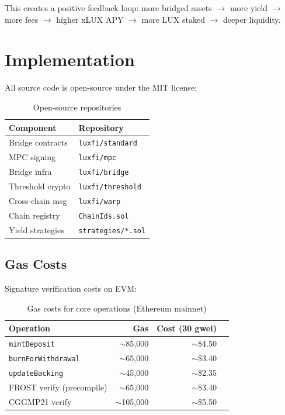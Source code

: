 \documentclass[11pt,twocolumn]{article}
\begin{document}
This creates a positive feedback loop: more bridged assets $\to$ more yield $\to$ more fees $\to$ higher xLUX APY $\to$ more LUX staked $\to$ deeper liquidity.

\section{Implementation}

All source code is open-source under the MIT license:

\begin{table}[h]
\centering
\small
\begin{tabular}{ll}
\toprule
\textbf{Component} & \textbf{Repository} \\
\midrule
Bridge contracts & \texttt{luxfi/standard} \\
MPC signing & \texttt{luxfi/mpc} \\
Bridge infra & \texttt{luxfi/bridge} \\
Threshold crypto & \texttt{luxfi/threshold} \\
Cross-chain msg & \texttt{luxfi/warp} \\
Chain registry & \texttt{ChainIds.sol} \\
Yield strategies & \texttt{strategies/*.sol} \\
\bottomrule
\end{tabular}
\caption{Open-source repositories}
\label{tab:repos}
\end{table}

\subsection{Gas Costs}

Signature verification costs on EVM:

\begin{table}[h]
\centering
\small
\begin{tabular}{lrrr}
\toprule
\textbf{Operation} & \textbf{Gas} & \textbf{Cost (30 gwei)} \\
\midrule
\texttt{mintDeposit} & $\sim$85,000 & $\sim$\$4.50 \\
\texttt{burnForWithdrawal} & $\sim$65,000 & $\sim$\$3.40 \\
\texttt{updateBacking} & $\sim$45,000 & $\sim$\$2.35 \\
FROST verify (precompile) & $\sim$65,000 & $\sim$\$3.40 \\
CGGMP21 verify & $\sim$105,000 & $\sim$\$5.50 \\
\bottomrule
\end{tabular}
\caption{Gas costs for core operations (Ethereum mainnet)}
\label{tab:gas}
\end{table}
\end{document}
